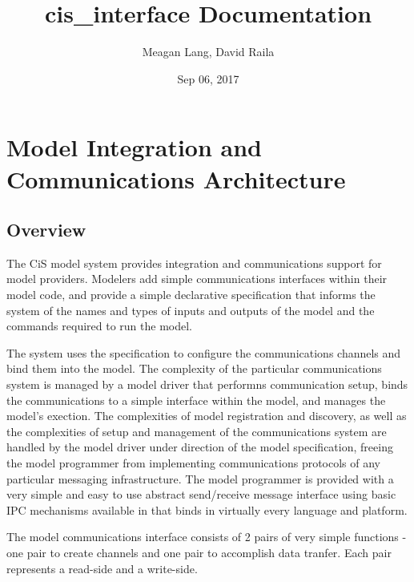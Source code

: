 \documentclass[letterpaper,10pt,english]{sphinxmanual}
\title{cis\_interface Documentation}
\date{Sep 06, 2017}
\author{Meagan Lang, David Raila}
\begin{document}
\maketitle
\sphinxtableofcontents
{}\label{\detokenize{index::doc}}



\chapter{Model Integration and Communications Architecture}
\label{\detokenize{includeme:model-integration-and-communications-architecture}}\label{\detokenize{includeme::doc}}\label{\detokenize{includeme:welcome-to-cis-interface-s-documentation}}

\section{Overview}
\label{\detokenize{includeme:overview}}
The CiS model system provides integration and communications support for
model providers. Modelers add simple communications interfaces within
their model code, and provide a simple declarative specification that
informs the system of the names and types of inputs and outputs of the
model and the commands required to run the model.

The system uses the specification to configure the communications
channels and bind them into the model. The complexity of the particular
communications system is managed by a model driver that performns
communication setup, binds the communications to a simple interface
within the model, and manages the model's exection. The complexities of
model registration and discovery, as well as the complexities of setup
and management of the communications system are handled by the model
driver under direction of the model specification, freeing the model
programmer from implementing communications protocols of any particular
messaging infrastructure. The model programmer is provided with a very
simple and easy to use abstract send/receive message interface using
basic IPC mechanisms available in that binds in virtually every language
and platform.

The model communications interface consists of 2 pairs of very simple
functions - one pair to create channels and one pair to accomplish data
tranfer. Each pair represents a read-side and a write-side.
\end{document}
